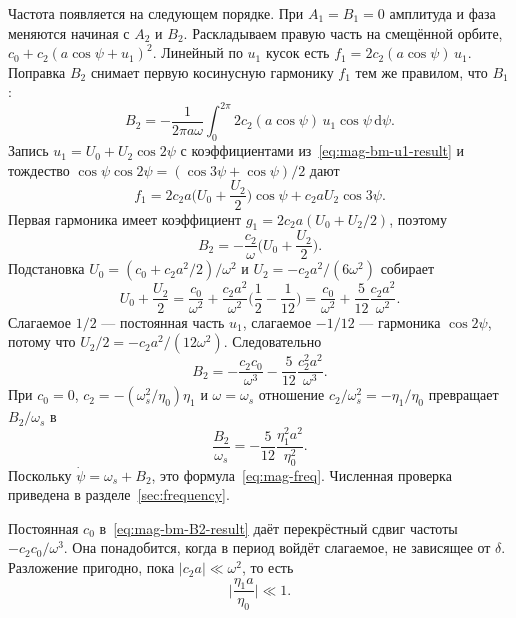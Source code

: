 Частота появляется на следующем порядке. При $A_1=B_1=0$ амплитуда и фаза меняются начиная с $A_2$ и $B_2$. Раскладываем правую часть на смещённой орбите, $c_0+c_2(a\cos\psi+u_1)^2$. Линейный по $u_1$ кусок есть $f_1=2c_2(a\cos\psi)\,u_1$. Поправка $B_2$ снимает первую косинусную гармонику $f_1$ тем же правилом, что $B_1$:
\begin{equation}
\label{eq:mag-bm-B2}
B_2=-\frac{1}{2\pi a\omega}
\int_0^{2\pi}2c_2(a\cos\psi)\,u_1\cos\psi\,\mathrm{d}\psi.
\end{equation}
Запись $u_1=U_0+U_2\cos 2\psi$ с коэффициентами из~\eqref{eq:mag-bm-u1-result} и тождество $\cos\psi\cos 2\psi=(\cos 3\psi+\cos\psi)/2$ дают
\begin{equation}
\label{eq:mag-bm-f1}
f_1=2c_2 a\Biggl(U_0+\frac{U_2}{2}\Biggr)\cos\psi
+c_2 a U_2\cos 3\psi.
\end{equation}
Первая гармоника имеет коэффициент $g_1=2c_2 a(U_0+U_2/2)$, поэтому
\begin{equation}
\label{eq:mag-bm-B2-alg}
B_2=-\frac{c_2}{\omega}\Biggl(U_0+\frac{U_2}{2}\Biggr).
\end{equation}
Подстановка $U_0=(c_0+c_2 a^2/2)/\omega^2$ и $U_2=-c_2 a^2/(6\omega^2)$ собирает
\begin{equation}
\label{eq:mag-bm-Usum}
U_0+\frac{U_2}{2}
=\frac{c_0}{\omega^2}+\frac{c_2 a^2}{\omega^2}\Biggl(\frac{1}{2}-\frac{1}{12}\Biggr)
=\frac{c_0}{\omega^2}+\frac{5}{12}\frac{c_2 a^2}{\omega^2}.
\end{equation}
Слагаемое $1/2$ --- постоянная часть $u_1$, слагаемое $-1/12$ --- гармоника $\cos 2\psi$, потому что $U_2/2=-c_2 a^2/(12\omega^2)$. Следовательно
\begin{equation}
\label{eq:mag-bm-B2-result}
B_2=-\frac{c_2 c_0}{\omega^3}-\frac{5}{12}\frac{c_2^2 a^2}{\omega^3}.
\end{equation}
При $c_0=0$, $c_2=-(\omega_s^2/\eta_0)\eta_1$ и $\omega=\omega_s$ отношение $c_2/\omega_s^2=-\eta_1/\eta_0$ превращает $B_2/\omega_s$ в
\begin{equation}
\label{eq:mag-bm-rel}
\frac{B_2}{\omega_s}
=-\frac{5}{12}\frac{\eta_1^2 a^2}{\eta_0^2}.
\end{equation}
Поскольку $\dot\psi=\omega_s+B_2$, это формула~\eqref{eq:mag-freq}. Численная проверка приведена в разделе~\ref{sec:frequency}.

Постоянная $c_0$ в~\eqref{eq:mag-bm-B2-result} даёт перекрёстный сдвиг частоты $-c_2 c_0/\omega^3$. Она понадобится, когда в период войдёт слагаемое, не зависящее от $\delta$. Разложение пригодно, пока $|c_2 a|\ll\omega^2$, то есть
\begin{equation}
\label{eq:mag-bm-valid}
\biggl|\frac{\eta_1 a}{\eta_0}\biggr|\ll 1.
\end{equation}
